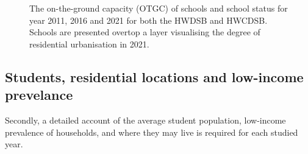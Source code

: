 \documentclass[
default
]{sn-jnl}
\begin{document}
\begin{figure}


\caption{\label{fig-Fig2}The on-the-ground capacity (OTGC) of schools
and school status for year 2011, 2016 and 2021 for both the HWDSB and
HWCDSB. Schools are presented overtop a layer visualising the degree of
residential urbanisation in 2021.}

\end{figure}%

\subsection{Students, residential locations and low-income
prevelance}\label{students-residential-locations-and-low-income-prevelance}

Secondly, a detailed account of the average student population,
low-income prevalence of households, and where they may live is required
for each studied year.
\end{document}
